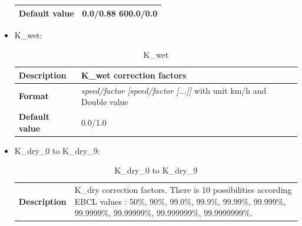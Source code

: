 \begin{itemize}
\begin{longtable}{|l|l|}
				\hline
				
				\begin{minipage}[t]{0.22\linewidth} \textbf{Default value}	\end{minipage}
				&	\begin{minipage}[t]{0.78\linewidth} 0.0/0.88 600.0/0.0 \end{minipage} \\
				
				\hline
			\end{longtable}
		
			\item K\_wet:
			\begin{longtable}{|l|l|}
				\caption{K\_wet}\\
				\hline
				
				\begin{minipage}[t]{0.22\linewidth} \textbf{Description}	\end{minipage}
				&	\begin{minipage}[t]{0.78\linewidth} K\_wet correction factors \end{minipage} \\
				
				\hline
				
				\begin{minipage}[t]{0.22\linewidth} \textbf{Format}	\end{minipage}
				&	\begin{minipage}[t]{0.78\linewidth} \textit{speed/factor [speed/factor [...]]}  with unit km/h and Double value\end{minipage} \\
				
				\hline
				
				\begin{minipage}[t]{0.22\linewidth} \textbf{Default value}	\end{minipage}
				&	\begin{minipage}[t]{0.78\linewidth} 0.0/1.0 \end{minipage} \\
				
				\hline
			\end{longtable}
			
			\item K\_dry\_0 to K\_dry\_9:
			\begin{longtable}{|l|l|}
				\caption{K\_dry\_0 to K\_dry\_9}\\
				\hline
				
				\begin{minipage}[t]{0.22\linewidth} \textbf{Description}	\end{minipage}
				&	\begin{minipage}[t]{0.78\linewidth} K\_dry correction factors. There is 10 possibilities according EBCL values : 50\%, 90\%, 99.0\%, 99.9\%, 99.99\%, 99.999\%, 99.9999\%, 99.99999\%, 99.999999\%, 99.9999999\%. \end{minipage} \\
				

\end{longtable}
\end{itemize}
